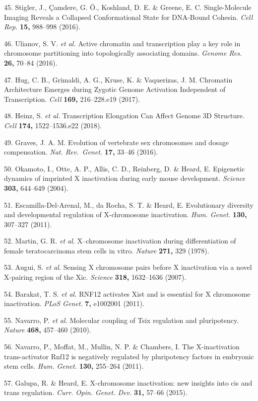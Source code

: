 \documentclass[11pt,twoside]{MPIthesis}
\theoremstyle{definition}
\theoremstyle{definition}
\theoremstyle{definition}
\theoremstyle{remark}
\begin{document}
45. Stigler, J., Çamdere, G. Ö., Koshland, D. E. \& Greene, E. C.
Single-Molecule Imaging Reveals a Collapsed Conformational State for
DNA-Bound Cohesin. \emph{Cell Rep.} \textbf{15,} 988--998 (2016).

46. Ulianov, S. V. \emph{et al.} Active chromatin and transcription play
a key role in chromosome partitioning into topologically associating
domains. \emph{Genome Res.} \textbf{26,} 70--84 (2016).

47. Hug, C. B., Grimaldi, A. G., Kruse, K. \& Vaquerizas, J. M.
Chromatin Architecture Emerges during Zygotic Genome Activation
Independent of Transcription. \emph{Cell} \textbf{169,} 216--228.e19
(2017).

48. Heinz, S. \emph{et al.} Transcription Elongation Can Affect Genome
3D Structure. \emph{Cell} \textbf{174,} 1522--1536.e22 (2018).

49. Graves, J. A. M. Evolution of vertebrate sex chromosomes and dosage
compensation. \emph{Nat. Rev.~Genet.} \textbf{17,} 33--46 (2016).

50. Okamoto, I., Otte, A. P., Allis, C. D., Reinberg, D. \& Heard, E.
Epigenetic dynamics of imprinted X inactivation during early mouse
development. \emph{Science} \textbf{303,} 644--649 (2004).

51. Escamilla-Del-Arenal, M., da Rocha, S. T. \& Heard, E. Evolutionary
diversity and developmental regulation of X-chromosome inactivation.
\emph{Hum. Genet.} \textbf{130,} 307--327 (2011).

52. Martin, G. R. \emph{et al.} X--chromosome inactivation during
differentiation of female teratocarcinoma stem cells in vitro.
\emph{Nature} \textbf{271,} 329 (1978).

53. Augui, S. \emph{et al.} Sensing X chromosome pairs before X
inactivation via a novel X-pairing region of the Xic. \emph{Science}
\textbf{318,} 1632--1636 (2007).

54. Barakat, T. S. \emph{et al.} RNF12 activates Xist and is essential
for X chromosome inactivation. \emph{PLoS Genet.} \textbf{7,} e1002001
(2011).

55. Navarro, P. \emph{et al.} Molecular coupling of Tsix regulation and
pluripotency. \emph{Nature} \textbf{468,} 457--460 (2010).

56. Navarro, P., Moffat, M., Mullin, N. P. \& Chambers, I. The
X-inactivation trans-activator Rnf12 is negatively regulated by
pluripotency factors in embryonic stem cells. \emph{Hum. Genet.}
\textbf{130,} 255--264 (2011).

57. Galupa, R. \& Heard, E. X-chromosome inactivation: new insights into
cis and trans regulation. \emph{Curr. Opin. Genet. Dev.} \textbf{31,}
57--66 (2015).
\end{document}
